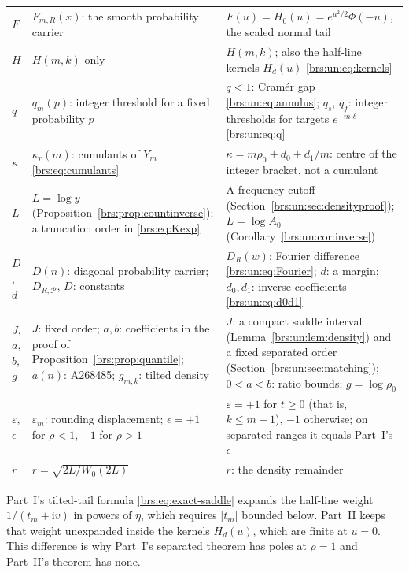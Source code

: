 \documentclass[11pt]{article}
\numberwithin{equation}{section}
\theoremstyle{remark}\newtheorem{remark}[theorem]{Remark}
\newcommand{\ii}{\mathrm i}\newcommand{\sgn}{\operatorname{sgn}}
\begin{document}
\begin{center}
\begin{longtable}{@{}>{\raggedright\arraybackslash}p{} >{\raggedright\arraybackslash}p{} >{\raggedright\arraybackslash}p{}@{}}
$F$ & $F_{m,R}(x)$: the smooth probability carrier & $F(u)=H_0(u)=e^{u^2/2}\Phi(-u)$, the scaled normal tail\\
$H$ & $H(m,k)$ only & $H(m,k)$; also the half-line kernels $H_d(u)$ \eqref{brs:un:eq:kernels}\\
$q$ & $q_m(p)$: integer threshold for a fixed probability $p$ & $q<1$: Cram\'er gap \eqref{brs:un:eq:annulus}; $q_s$, $q_f$: integer thresholds for targets $e^{-m\ell}$ \eqref{brs:un:eq:q}\\
$\kappa$ & $\kappa_r(m)$: cumulants of $Y_m$ \eqref{brs:eq:cumulants} & $\kappa=m\rho_0+d_0+d_1/m$: centre of the integer bracket, not a cumulant\\
$L$ & $L=\log y$ (Proposition~\ref{brs:prop:countinverse}); a truncation order in \eqref{brs:eq:Kexp} & A frequency cutoff (Section~\ref{brs:un:sec:densityproof}); $L=\log A_0$ (Corollary~\ref{brs:un:cor:inverse})\\
$D$, $d$ & $D(n)$: diagonal probability carrier; $D_{R,\mathcal P}$, $D$: constants & $D_R(w)$: Fourier difference \eqref{brs:un:eq:Fourier}; $d$: a margin; $d_0,d_1$: inverse coefficients \eqref{brs:un:eq:d0d1}\\
$J$, $a$, $b$, $g$ & $J$: fixed order; $a,b$: coefficients in the proof of Proposition~\ref{brs:prop:quantile}; $a(n)$: A268485; $g_{m,k}$: tilted density & $J$: a compact saddle interval (Lemma~\ref{brs:un:lem:density}) and a fixed separated order (Section~\ref{brs:un:sec:matching}); $0<a<b$: ratio bounds; $g=\log\rho_0$\\
$\varepsilon$, $\epsilon$ & $\varepsilon_m$: rounding displacement; $\epsilon=+1$ for $\rho<1$, $-1$ for $\rho>1$ & $\varepsilon=+1$ for $t\ge0$ (that is, $k\le m+1$), $-1$ otherwise; on separated ranges it equals Part~I's $\epsilon$\\
$r$ & $r=\sqrt{2L/W_0(2L)}$ & $r$: the density remainder\\
\bottomrule
\end{longtable}
\end{center}
Part~I's tilted-tail formula \eqref{brs:eq:exact-saddle} expands the half-line weight $1/(t_m+\ii v)$ in powers of $\eta$, which requires $|t_m|$ bounded below. Part~II keeps that weight unexpanded inside the kernels $H_d(u)$, which are finite at $u=0$. This difference is why Part~I's separated theorem has poles at $\rho=1$ and Part~II's theorem has none.
\end{document}
